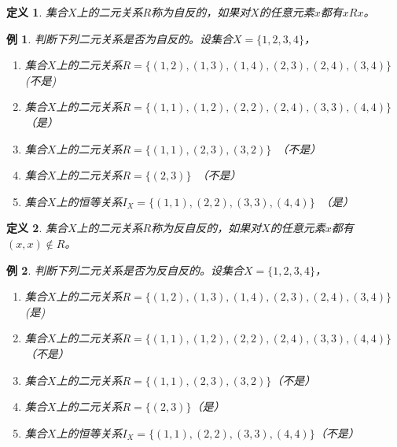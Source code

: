 \documentclass{book}[oneside]
\newtheorem{Def}{定义}[chapter]
\newtheorem{Example}{例}[chapter]
\begin{document}
\begin{CJK*}{UTF8}{gbsn}
  \begin{Def}
    集合$X$上的二元关系$R$称为自反的，如果对$X$的任意元素$x$都有$xRx$。
  \end{Def}
  \begin{Example}
    
    判断下列二元关系是否为自反的。设集合$X=\{1,2,3,4\}$，
  \begin{enumerate}
  \item 集合$X$上的二元关系$R=\{(1,2), (1,3), (1,4), (2,3),
    (2,4), (3,4)\}$ (不是)
  \item 集合$X$上的二元关系$R=\{(1,1), (1,2), (2,2),
    (2,4), (3,3), (4,4)\}$　（是）
  \item 集合$X$上的二元关系$R = \{(1,1), (2,3), (3,2)\}$　（不是）
  \item 集合$X$上的二元关系$R = \{(2,3)\}$　（不是）
  \item 集合$X$上的恒等关系$I_X = \{(1,1), (2,2), (3,3),(4,4)\}$　（是）
  \end{enumerate}
  \end{Example}
  \begin{Def}
   集合$X$上的二元关系$R$称为反自反的，如果对$X$的任意元素$x$都有$(x,x) \notin R$。
 \end{Def}
 \begin{Example}   
    判断下列二元关系是否为反自反的。设集合$X=\{1,2,3,4\}$，
  \begin{enumerate}
  \item 集合$X$上的二元关系$R=\{(1,2), (1,3), (1,4), (2,3),
    (2,4), (3,4)\}$(是)
  \item 集合$X$上的二元关系$R=\{(1,1), (1,2), (2,2),
    (2,4), (3,3), (4,4)\}$　（不是）
  \item 集合$X$上的二元关系$R = \{(1,1), (2,3), (3,2)\}$（不是）
  \item 集合$X$上的二元关系$R = \{(2,3)\}$（是）
  \item 集合$X$上的恒等关系$I_X = \{(1,1), (2,2), (3,3),(4,4)\}$（不是）
  \end{enumerate}
 \end{Example}


\end{CJK*}
\end{document}
